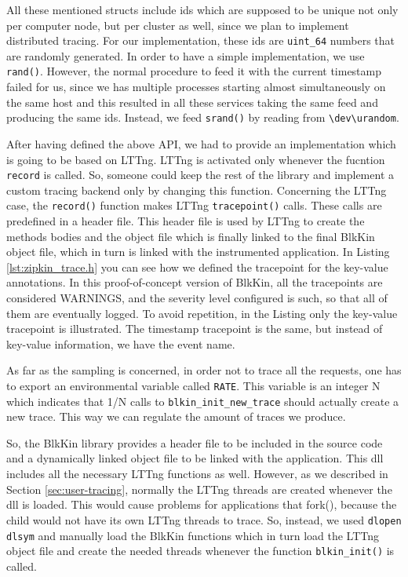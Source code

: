
All these mentioned structs include ids which are supposed to be unique not only
per computer node, but per cluster as well, since we plan to implement
distributed tracing. For our implementation, these ids are \texttt{uint\_64}
numbers that are randomly generated. In order to have a simple implementation,
we use \texttt{rand()}. However, the normal procedure to feed it with the
current timestamp failed for us, since we has multiple processes starting almost
simultaneously on the same host and this resulted in all these services taking
the same feed and producing the same ids. Instead, we feed \texttt{srand()} by
reading from \texttt{\textbackslash dev\textbackslash urandom}.

After having defined the above API, we had to provide an implementation which is
going to be based on LTTng. LTTng is activated only whenever the fucntion
\texttt{record} is called. So, someone could keep the rest of the library and
implement a custom tracing backend only by changing this function. Concerning
the LTTng case, the \texttt{record()} function makes LTTng \texttt{tracepoint()}
calls. These calls are predefined in a header file. This header file is used by
LTTng to create the methods bodies and the object file which is finally linked
to the final BlkKin object file, which in turn is linked with the instrumented
application. In Listing \ref{lst:zipkin_trace.h} you can see how we defined the
tracepoint for the key-value annotations. In this proof-of-concept version
of BlkKin, all the tracepoints are considered WARNINGS, and the severity level
configured is such, so that all of them are eventually logged. To avoid
repetition, in the Listing only the key-value tracepoint is illustrated. The
timestamp tracepoint is the same, but instead of key-value information, we have
the event name.


As far as the sampling is concerned, in order not to trace all the requests, one
has to export an environmental variable called \texttt{RATE}. This variable is
an integer N which indicates that 1/N calls to \texttt{blkin\_init\_new\_trace}
should actually create a new trace. This way we can regulate the amount of
traces we produce.

So, the BlkKin library provides a header file to be included in the source code
and a dynamically linked object file to be linked with the application. This dll
includes all the necessary LTTng functions as well. However, as we described in
Section \ref{sec:user-tracing}, normally the LTTng threads are created whenever
the dll is loaded. This would cause problems for applications that fork(),
because the child would not have its own LTTng threads to trace. So, instead, we
used \texttt{dlopen} \texttt{dlsym} and manually load the BlkKin functions which
in turn load the LTTng object file and create the needed threads whenever the
function \texttt{blkin\_init()} is called.

